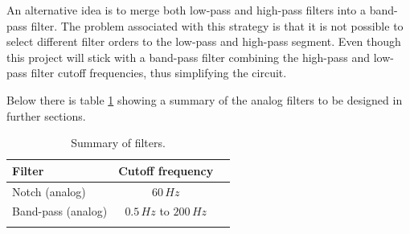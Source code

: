 An alternative idea is to merge both low-pass and high-pass filters into a band-pass filter. The problem associated with this strategy is that it is not possible to select different filter orders to the low-pass and high-pass segment. Even though this project will stick with a band-pass filter combining the high-pass and low-pass filter cutoff frequencies, thus simplifying the circuit.

Below there is table \ref{tbl:1} showing a summary of the analog filters to be designed in further sections.

\begin{longtable}[H]{lcc}

\toprule
Filter & Cutoff frequency\\
\midrule
\endhead
Notch (analog) & $60 \, Hz$ \\
Band-pass (analog) & $0.5 \, Hz$ to $200 \, Hz$  \\
\bottomrule
\caption{Summary of filters.}
\label{tbl:1}
\end{longtable}


\pagebreak